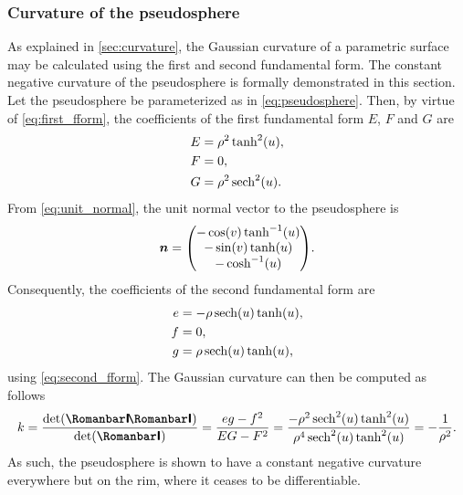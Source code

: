 \subsubsection{Curvature of the pseudosphere}
As explained in \cref{sec:curvature}, the Gaussian curvature of a parametric surface may be calculated using the first and second fundamental form. The constant negative curvature of the pseudosphere is formally demonstrated in this section. 
Let the pseudosphere be parameterized as in \cref{eq:pseudosphere}. Then, by virtue of \cref{eq:first_fform}, the coefficients of the first fundamental form \(E\), \(F\) and \(G\) are
\[
    \begin{split}
        E & = \rho^2\tanh[2](u), \\
        F & = 0, \\
        G & = \rho^2\sech[2](u). \\
    \end{split}
\]
From \cref{eq:unit_normal}, the unit normal vector to the pseudosphere is
\[
    \vec{n} 
    = \mqty(
        -\cos(v)\tanh[-1](u) \\
        -\sin(v)\tanh(u)\\
        -\cosh[-1](u)\\
    ).
\]
Consequently, the coefficients of the second fundamental form are
\begin{equation*}
    \begin{split}
        e &= -\rho\sech(u)\tanh(u),\\
        f &= 0,\\
        g &= \rho\sech(u)\tanh(u),\\
    \end{split}
\end{equation*}
using \cref{eq:second_fform}.
The Gaussian curvature can then be computed as follows \cite{ONeill2006}
\begin{equation}
    k = \frac{\det(\secondff)}{\det(\firstff)} = \frac{eg - f^2}{EG - F^2} 
    = \frac{-
    \rho^2\sech[2](u)\tanh[2](u)}{\rho^4\sech[2](u)\tanh[2](u)} = -\frac{1}{\rho^2}.
\end{equation}
As such, the pseudosphere is shown to have a constant negative curvature everywhere but on the rim, where it ceases to be differentiable.

